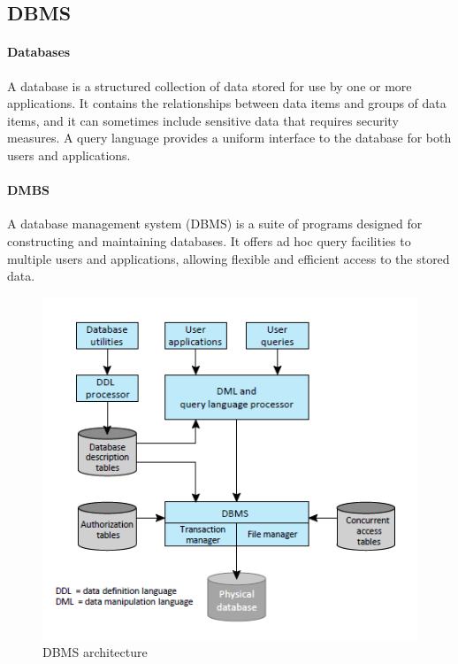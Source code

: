 \documentclass{article}
\begin{document}
            \subsection{DBMS}
                	\paragraph{Databases}
                    A database is a structured collection of data stored for use by one or more applications. It contains the relationships between data items and groups of data items, and it can sometimes include sensitive data that requires security measures. A query language provides a uniform interface to the database for both users and applications.
                    
                    \paragraph{DMBS}
                        A database management system (DBMS) is a suite of programs designed for constructing and maintaining databases. It offers ad hoc query facilities to multiple users and applications, allowing flexible and efficient access to the stored data.
                    
                        
                        \begin{figure}[h]
                            \centering
                            \includegraphics[scale=0.5]{../immagini/Dbmsarchiteture.png}
                            \caption{DBMS architecture}
                        \end{figure}
\end{document}
